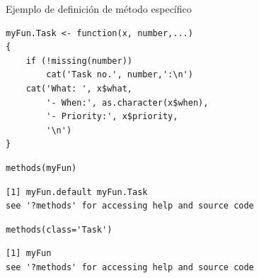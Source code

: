 \documentclass[xcolor={usenames,svgnames,dvipsnames}]{beamer}
\begin{document}
\begin{frame}[label={sec:orga7d0f06},fragile]{Ejemplo de definición de método específico}
 \lstset{language=r,label= ,caption= ,captionpos=b,numbers=none}
\begin{lstlisting}
myFun.Task <- function(x, number,...)
{
    if (!missing(number))
        cat('Task no.', number,':\n')
    cat('What: ', x$what,
        '- When:', as.character(x$when),
        '- Priority:', x$priority,
        '\n')
}
\end{lstlisting}

\lstset{language=r,label= ,caption= ,captionpos=b,numbers=none}
\begin{lstlisting}
methods(myFun)
\end{lstlisting}

\begin{verbatim}
[1] myFun.default myFun.Task   
see '?methods' for accessing help and source code
\end{verbatim}


\lstset{language=r,label= ,caption= ,captionpos=b,numbers=none}
\begin{lstlisting}
methods(class='Task')
\end{lstlisting}

\begin{verbatim}
[1] myFun
see '?methods' for accessing help and source code
\end{verbatim}
\end{frame}
\end{document}
